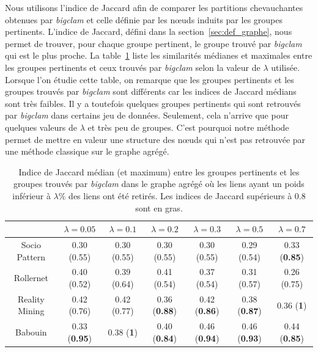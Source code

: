 Nous utilisons l'indice de Jaccard afin de comparer les partitions chevauchantes obtenues par \emph{bigclam} et celle définie par les n\oe{}uds induits par les groupes pertinents.
L'indice de Jaccard, défini dans la section~\ref{sec:def_graphe}, nous permet de trouver, pour chaque groupe pertinent, le groupe trouvé par \emph{bigclam} qui est le plus proche.
La table~\ref{tab:Jaccard} liste les similarités médianes et maximales entre les groupes pertinents et ceux trouvés par \emph{bigclam} selon la valeur de $\lambda$ utilisée.
Lorsque l'on étudie cette table, on remarque que les groupes pertinents et les groupes trouvés par \emph{bigclam} sont différents car les indices de Jaccard médians sont très faibles.
Il y a toutefois quelques groupes pertinents qui sont retrouvés par \emph{bigclam} dans certains jeu de données.
Seulement, cela n'arrive que pour quelques valeurs de $\lambda$ et très peu de groupes.
C'est pourquoi notre méthode permet de mettre en valeur une structure des n\oe{}uds qui n'est pas retrouvée par une méthode classique sur le graphe agrégé.

\begin{table}
\centering
\hspace*{-15.75pt}
\begin{tabular}{|c|c|c|c|c|c|c|}
\hline  \rule[-1ex]{0pt}{3.5ex}  & $\lambda= 0.05$ &$\lambda= 0.1$ & $\lambda=0.2$ & $\lambda=0.3$ & $\lambda=0.5$ & $\lambda=0.7$ \\ 
\hline Socio Pattern & 0.30 (0.55)  & 0.30 (0.55)  & 0.30 (0.55)  & 0.30 (0.55)  & 0.29 (0.54) & 0.33 (\textbf{0.85})  \\ 
\hline Rollernet & 0.40 (0.52) & 0.39 (0.64) & 0.41 (0.54) & 0.37 (0.54) & 0.31 (0.57)  &  0.26 (0.75) \\ 
\hline Reality Mining & 0.42 (0.76)  & 0.42 (0.77) & 0.36 (\textbf{0.88}) & 0.42 (\textbf{0.86}) & 0.38 (\textbf{0.87})  & 0.36 (\textbf{1}) \\ 
\hline Babouin & 0.33 (\textbf{0.95}) & 0.38 (\textbf{1}) & 0.40 (\textbf{0.84}) & 0.46 (\textbf{0.94}) & 0.46 (\textbf{0.93}) & 0.44 (\textbf{0.85}) \\ 
\hline 
\end{tabular} 
\caption{Indice de Jaccard médian (et maximum) entre les groupes pertinents et les groupes trouvés par \emph{bigclam} dans le graphe agrégé où les liens ayant un poids inférieur à $\lambda\%$ des liens ont été retirés.
Les indices de Jaccard supérieurs à $0.8$ sont en gras.}
\label{tab:Jaccard}  
\end{table}

